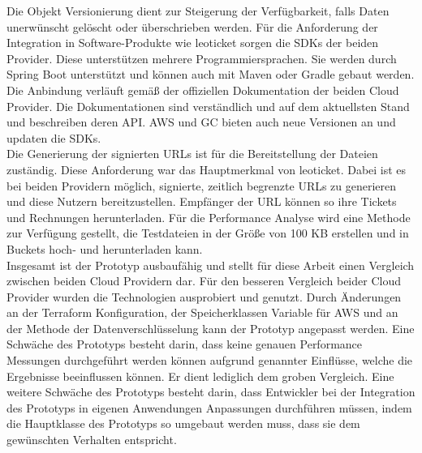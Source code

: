 Die Objekt Versionierung dient zur Steigerung der Verfügbarkeit, falls Daten unerwünscht gelöscht oder überschrieben werden. Für die Anforderung der Integration in Software-Produkte wie leoticket sorgen die SDKs der beiden Provider. Diese unterstützen mehrere Programmiersprachen. Sie werden durch Spring Boot unterstützt und können auch mit Maven oder Gradle gebaut werden. Die Anbindung verläuft gemäß der offiziellen Dokumentation der beiden Cloud Provider. Die Dokumentationen sind verständlich und auf dem aktuellsten Stand und beschreiben deren API. AWS und GC bieten auch neue Versionen an und updaten die SDKs.\\ 

Die Generierung der signierten URLs ist für die Bereitstellung der Dateien zuständig. Diese Anforderung war das Hauptmerkmal von leoticket. Dabei ist es bei beiden Providern möglich, signierte, zeitlich begrenzte URLs zu generieren und diese Nutzern bereitzustellen. Empfänger der URL können so ihre Tickets und Rechnungen herunterladen. Für die Performance Analyse wird eine Methode zur Verfügung gestellt, die Testdateien in der Größe von 100 KB erstellen und in Buckets hoch- und herunterladen kann.\\

Insgesamt ist der Prototyp ausbaufähig und stellt für diese Arbeit einen Vergleich zwischen beiden Cloud Providern dar. Für den besseren Vergleich beider Cloud Provider wurden die Technologien ausprobiert und genutzt. Durch Änderungen an der Terraform Konfiguration, der Speicherklassen Variable für AWS und an der Methode der Datenverschlüsselung kann der Prototyp angepasst werden. Eine Schwäche des Prototyps besteht darin, dass keine genauen Performance Messungen durchgeführt werden können aufgrund genannter Einflüsse, welche die Ergebnisse beeinflussen können. Er dient lediglich dem groben Vergleich. Eine weitere Schwäche des Prototyps besteht darin, dass Entwickler bei der Integration des Prototyps in eigenen Anwendungen Anpassungen durchführen müssen, indem die Hauptklasse des Prototyps so umgebaut werden muss, dass sie dem gewünschten Verhalten entspricht.